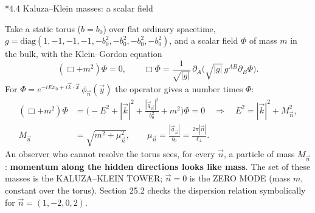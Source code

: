 \documentclass[10pt,a4paper]{article}
\makeatletter
\renewcommand\subsection{\@startsection{subsection}{2}{\z@}{-3.25ex\@plus -1ex \@minus -.2ex}{1.5ex \@plus .2ex}{\normalfont\large\bfseries\raggedright}}
\makeatother
\begin{document}
\subsection*{4.4 Kaluza–Klein masses: a scalar field}
Take a static torus ($b=b_0$) over flat ordinary spacetime, $g=\mathrm{diag}(1,-1,-1,-1,-b_0^2,-b_0^2,-b_0^2,-b_0^2)$, and a scalar field $\Phi$ of mass $m$ in the bulk, with the Klein–Gordon equation
\begin{equation*}
(\Box+m^2)\Phi=0,\qquad \Box\Phi=\frac1{\sqrt{|g|}}\,\partial_A\big(\sqrt{|g|}\,g^{AB}\partial_B\Phi\big).
\end{equation*}
For $\Phi=e^{-iEx_0+i\vec k\cdot\vec x}\,\phi_{\vec n}(\vec y)$ the operator gives a number times $\Phi$:
\begin{align*}
(\Box+m^2)\Phi&=\Big(-E^2+|\vec k|^2+\frac{|\vec q_{\vec n}|^2}{b_0^2}+m^2\Big)\Phi=0\quad\Longrightarrow\quad E^2=|\vec k|^2+M_{\vec n}^2, \\
M_{\vec n}&=\sqrt{m^2+\mu_{\vec n}^2},\qquad \mu_{\vec n}=\frac{|\vec q_{\vec n}|}{b_0}=\frac{2\pi|\vec n|}{\ell_\perp}.
\end{align*}
An observer who cannot resolve the torus sees, for every $\vec n$, a particle of mass $M_{\vec n}$: \textbf{momentum along the hidden directions looks like mass}. The set of these masses is the KALUZA–KLEIN TOWER; $\vec n=0$ is the ZERO MODE (mass $m$, constant over the torus). Section 25.2 checks the dispersion relation symbolically for $\vec n=(1,-2,0,2)$.
\end{document}
